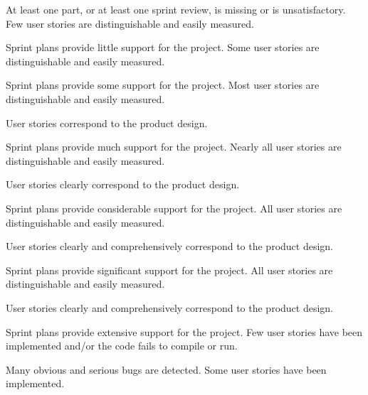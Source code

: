 \documentclass{../../fal_assignment}
\begin{document}
\rubricyeartwo
\begin{markingrubric}
		\grade\fail At least one part, or at least one sprint review, is missing or is unsatisfactory.
%
        \grade \fail Few user stories are distinguishable and easily measured.
            \par Sprint plans provide little support for the project.
        \grade Some user stories are distinguishable and easily measured.
            \par Sprint plans provide some support for the project.
        \grade Most user stories are distinguishable and easily measured.
            \par User stories correspond to the product design.
            \par Sprint plans provide much support for the project.
        \grade Nearly all user stories are distinguishable and easily measured.
            \par User stories clearly correspond to the product design.
            \par Sprint plans provide considerable support for the project.
        \grade All user stories are distinguishable and easily measured.
            \par User stories clearly and comprehensively correspond to the product design.
            \par Sprint plans provide significant support for the project.
        \grade All user stories are distinguishable and easily measured.
            \par User stories clearly and comprehensively correspond to the product design.
            \par Sprint plans provide extensive support for the project.
%
        \grade \fail Few user stories have been implemented  and/or the code fails to compile or run.
            \par Many obvious and serious bugs are detected.
        \grade Some user stories have been implemented.

\end{markingrubric}
\end{document}
